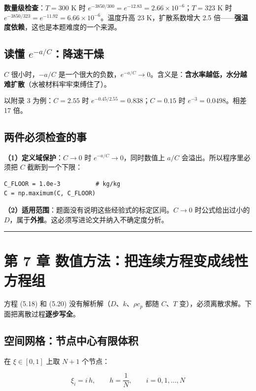 \textbf{数量级检查}：$T=300$ K 时 $e^{-3850/300}=e^{-12.83}=2.66\times10^{-6}$；$T=323$ K 时 $e^{-3850/323}=e^{-11.92}=6.66\times10^{-6}$。温度升高 23 K，扩散系数增大 2.5 倍——\textbf{强温度依赖}，这也是本题难度的一个来源。


\subsection{读懂 $e^{-a/C}$：降速干燥}


$C$ 很小时，$-a/C$ 是一个很大的负数，$e^{-a/C}\to0$。含义是：\textbf{含水率越低，水分越难扩散}（水被材料牢牢束缚住了）。


以附录 3 为例：$C=2.55$ 时 $e^{-0.45/2.55}=0.838$；$C=0.15$ 时 $e^{-3}=0.0498$。相差 17 倍。


\subsection{两件必须检查的事}


\textbf{（1）定义域保护}：$C\to0$ 时 $e^{-a/C}\to0$，同时数值上 $a/C$ 会溢出。所以程序里必须把 $C$ 截断到一个下限：


\begin{lstlisting}
C_FLOOR = 1.0e-3          # kg/kg
C = np.maximum(C, C_FLOOR)
\end{lstlisting}


\textbf{（2）适用范围}：题面没有说明这些经验式的标定区间。$C\to0$ 时公式给出过小的 $D$，属于\textbf{外推}。这必须写进论文并纳入不确定度分析。


\vspace{1mm}\hrule\vspace{1mm}


\section{第 7 章 数值方法：把连续方程变成线性方程组}


方程 (5.18) 和 (5.20) 没有解析解（$D$、$k$、$\rho c_p$ 都随 $C$、$T$ 变），必须离散求解。下面把离散过程\textbf{逐步写全}。


\subsection{空间网格：节点中心有限体积}


在 $\xi\in[0,1]$ 上取 $N+1$ 个节点：


\begin{equation}
\xi_i=i\,h,\qquad h=\frac1N,\qquad i=0,1,\dots,N\tag{7.1}
\end{equation}


